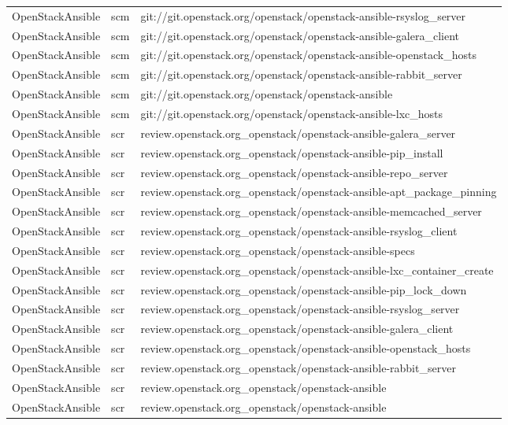 \begin{center}
\begin{longtable}{|p{4cm}|p{1cm}|p{10cm}|}
OpenStackAnsible&scm&git://git.openstack.org/openstack/openstack-ansible-rsyslog\_server\\ 
OpenStackAnsible&scm&git://git.openstack.org/openstack/openstack-ansible-galera\_client\\ 
OpenStackAnsible&scm&git://git.openstack.org/openstack/openstack-ansible-openstack\_hosts\\ 
OpenStackAnsible&scm&git://git.openstack.org/openstack/openstack-ansible-rabbit\_server\\ 
OpenStackAnsible&scm&git://git.openstack.org/openstack/openstack-ansible\\ 
OpenStackAnsible&scm&git://git.openstack.org/openstack/openstack-ansible-lxc\_hosts\\ 
OpenStackAnsible&scr&review.openstack.org\_openstack/openstack-ansible-galera\_server\\ 
OpenStackAnsible&scr&review.openstack.org\_openstack/openstack-ansible-pip\_install\\ 
OpenStackAnsible&scr&review.openstack.org\_openstack/openstack-ansible-repo\_server\\ 
OpenStackAnsible&scr&review.openstack.org\_openstack/openstack-ansible-apt\_package\_pinning\\ 
OpenStackAnsible&scr&review.openstack.org\_openstack/openstack-ansible-memcached\_server\\ 
OpenStackAnsible&scr&review.openstack.org\_openstack/openstack-ansible-rsyslog\_client\\ 
OpenStackAnsible&scr&review.openstack.org\_openstack/openstack-ansible-specs\\ 
OpenStackAnsible&scr&review.openstack.org\_openstack/openstack-ansible-lxc\_container\_create\\ 
OpenStackAnsible&scr&review.openstack.org\_openstack/openstack-ansible-pip\_lock\_down\\ 
OpenStackAnsible&scr&review.openstack.org\_openstack/openstack-ansible-rsyslog\_server\\ 
OpenStackAnsible&scr&review.openstack.org\_openstack/openstack-ansible-galera\_client\\ 
OpenStackAnsible&scr&review.openstack.org\_openstack/openstack-ansible-openstack\_hosts\\ 
OpenStackAnsible&scr&review.openstack.org\_openstack/openstack-ansible-rabbit\_server\\ 
OpenStackAnsible&scr&review.openstack.org\_openstack/openstack-ansible\\ 
OpenStackAnsible&scr&review.openstack.org\_openstack/openstack-ansible\\ 

\end{longtable}
\end{center}

